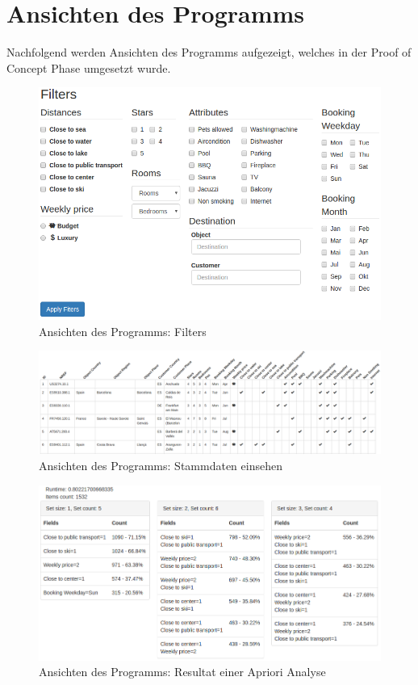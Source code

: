 \chapter{Ansichten des Programms}
Nachfolgend werden Ansichten des Programms aufgezeigt, welches in der Proof of Concept Phase umgesetzt wurde.
\label{app:pocansichten}
\begin{figure}[H]
	\RawFloats
	\centering
	\includegraphics[width=1\textwidth]{images/program-filters}
	\caption{Ansichten des Programms: Filters}
\end{figure}
\begin{figure}[H]
	\RawFloats
	\centering
	\includegraphics[width=1\textwidth]{images/program-explore-results}
	\caption{Ansichten des Programms: Stammdaten einsehen}
\end{figure}
\begin{figure}[H]
	\RawFloats
	\centering
	\includegraphics[width=1\textwidth]{images/program-apriori-results}
	\caption{Ansichten des Programms: Resultat einer Apriori Analyse}
\end{figure}
